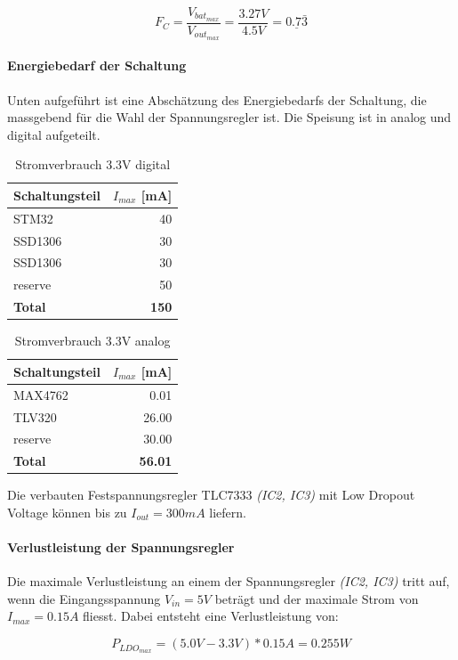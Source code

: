 \begin{equation}
F_C=\frac{V_{bat_{max}}}{V_{out_{max}}}=\frac{3.27\si{V}}{4.5\si{V}}=\underline{0.7\bar{3}}
\end{equation}

\paragraph{Energiebedarf der Schaltung}

Unten aufgeführt ist eine Abschätzung des Energiebedarfs der Schaltung, die massgebend für die Wahl der Spannungsregler ist. Die Speisung ist in analog und digital aufgeteilt.

\begin{table}[H]
\centering
\begin{tabular}{|l|r|}
\hline
\textbf{Schaltungsteil} & \textbf{$I_{max}$ {[}\si{mA}{]}} \\ \hline
STM32                   & 40                     \\ \hline
SSD1306                 & 30                     \\ \hline
SSD1306                 & 30                     \\ \hline
reserve                 & 50                     \\ \hline
\textbf{Total}          & \textbf{150}          \\ \hline
\end{tabular}
\caption{Stromverbrauch 3.3V digital}
\end{table}

\begin{table}[H]
\centering
\begin{tabular}{|l|r|}
\hline
\textbf{Schaltungsteil} & \textbf{$I_{max}$ {[}\si{mA}{]}} \\ \hline
MAX4762                 & 0.01                   \\ \hline
TLV320                  & 26.00                  \\ \hline
reserve                 & 30.00                  \\ \hline
\textbf{Total}          & \textbf{56.01}        \\ \hline
\end{tabular}
\caption{Stromverbrauch 3.3V analog}
\end{table}

Die verbauten Festspannungsregler TLC7333 \textit{(IC2, IC3)} mit Low Dropout Voltage können bis zu ${I_{out}=300\si{mA}}$ liefern.

\paragraph{Verlustleistung der Spannungsregler}

Die maximale Verlustleistung an einem der Spannungsregler \textit{(IC2, IC3)} tritt auf, wenn die Eingangsspannung ${V_{in}=5\si{V}}$ beträgt und der maximale Strom von ${I_{max}=0.15\si{A}}$ fliesst.
Dabei entsteht eine Verlustleistung von:

\begin{equation}
P_{LDO_{max}}=(5.0\si{V}-3.3\si{V})*0.15\si{A}=0.255\si{W}
\end{equation}

